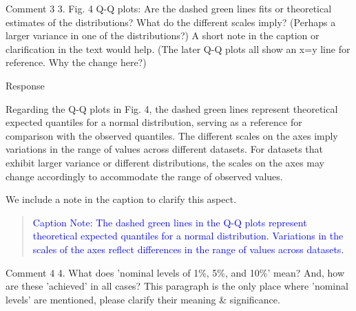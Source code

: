 \documentclass[11pt]{report}
\begin{document}
\begin{reviewbox}{Comment 3}
3. Fig. 4 Q-Q plots: Are the dashed green lines fits or theoretical estimates of the distributions? What do the different scales imply? (Perhaps a larger variance in one of the distributions?) A short note in the caption or clarification in the text would help. (The later Q-Q plots all show an x=y line for reference. Why the change here?)
\end{reviewbox}

\begin{responsebox}{Response}

Regarding the Q-Q plots in Fig. 4, the dashed green lines represent theoretical expected quantiles for a normal distribution, serving as a reference for comparison with the observed quantiles. The different scales on the axes imply variations in the range of values across different datasets. For datasets that exhibit larger variance or different distributions, the scales on the axes may change accordingly to accommodate the range of observed values. 

We include a note in the caption to clarify this aspect.


\begin{quote}
	\textcolor{blue}{
		Caption Note: The dashed green lines in the Q-Q plots represent theoretical expected quantiles for a normal distribution. Variations in the scales of the axes reflect differences in the range of values across datasets.
}
\end{quote}
	
\end{responsebox}
\begin{reviewbox}{Comment 4}
4. What does 'nominal levels of 1\%, 5\%, and 10\%' mean? And, how are these 'achieved' in all cases? This paragraph is the only place where 'nominal levels' are mentioned, please clarify their meaning \& significance.
\end{reviewbox}
\end{document}
